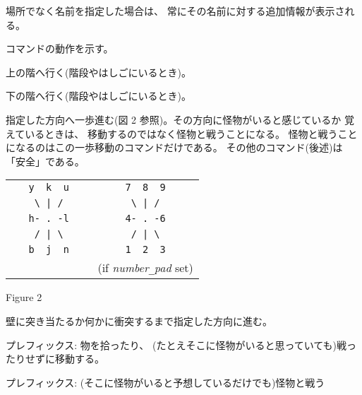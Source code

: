 場所でなく名前を指定した場合は、
常にその名前に対する追加情報が表示される。
\item[\tb{\&}]
コマンドの動作を示す。
\item[\tb{<}]
上の階へ行く(階段やはしごにいるとき)。
\item[\tb{>}]
下の階へ行く(階段やはしごにいるとき)。
\item[\tb{[yuhjklbn]}]
指定した方向へ一歩進む(図 2 参照)。その方向に怪物がいると感じているか
覚えているときは、
移動するのではなく怪物と戦うことになる。
怪物と戦うことになるのはこの一歩移動のコマンドだけである。
その他のコマンド(後述)は「安全」である。
\begin{center}
\begin{tabular}{cc}
\verb+   y  k  u   + & \verb+   7  8  9   +\\
\verb+    \ | /    + & \verb+    \ | /    +\\
\verb+   h- . -l   + & \verb+   4- . -6   +\\
\verb+    / | \    + & \verb+    / | \    +\\
\verb+   b  j  n   + & \verb+   1  2  3   +\\
                     & (if {\it number\verb+_+pad\/} set)
\end{tabular}
\end{center}
\begin{center}
Figure 2
\end{center}
\item[\tb{[YUHJKLBN]}]
壁に突き当たるか何かに衝突するまで指定した方向に進む。
\item[\tb{m[yuhjklbn]}]
プレフィックス: 物を拾ったり、
(たとえそこに怪物がいると思っていても)戦ったりせずに移動する。
\item[\tb{F[yuhjklbn]}]
プレフィックス: (そこに怪物がいると予想しているだけでも)怪物と戦う
